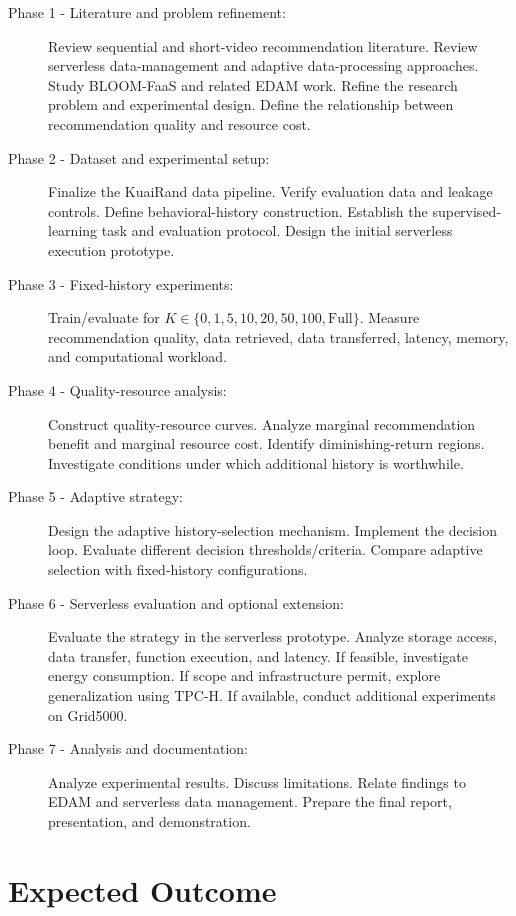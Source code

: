 \documentclass[12pt,a4paper]{article}
\begin{document}
\begin{description}
    \item[Phase 1 - Literature and problem refinement:] Review sequential and short-video recommendation literature. Review serverless data-management and adaptive data-processing approaches. Study BLOOM-FaaS and related EDAM work. Refine the research problem and experimental design. Define the relationship between recommendation quality and resource cost.
    \item[Phase 2 - Dataset and experimental setup:] Finalize the KuaiRand data pipeline. Verify evaluation data and leakage controls. Define behavioral-history construction. Establish the supervised-learning task and evaluation protocol. Design the initial serverless execution prototype.
    \item[Phase 3 - Fixed-history experiments:] Train/evaluate for $K \in \{0, 1, 5, 10, 20, 50, 100, \text{Full}\}$. Measure recommendation quality, data retrieved, data transferred, latency, memory, and computational workload.
    \item[Phase 4 - Quality-resource analysis:] Construct quality-resource curves. Analyze marginal recommendation benefit and marginal resource cost. Identify diminishing-return regions. Investigate conditions under which additional history is worthwhile.
    \item[Phase 5 - Adaptive strategy:] Design the adaptive history-selection mechanism. Implement the decision loop. Evaluate different decision thresholds/criteria. Compare adaptive selection with fixed-history configurations.
    \item[Phase 6 - Serverless evaluation and optional extension:] Evaluate the strategy in the serverless prototype. Analyze storage access, data transfer, function execution, and latency. If feasible, investigate energy consumption. If scope and infrastructure permit, explore generalization using TPC-H. If available, conduct additional experiments on Grid5000.
    \item[Phase 7 - Analysis and documentation:] Analyze experimental results. Discuss limitations. Relate findings to EDAM and serverless data management. Prepare the final report, presentation, and demonstration.
\end{description}

\section{Expected Outcome}
\end{document}

